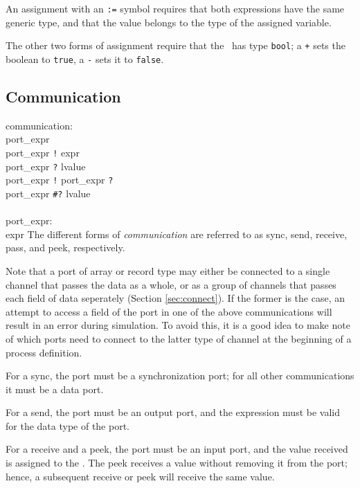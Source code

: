 An assignment with an {\tt{}:=} symbol requires that both expressions
have the same generic type, and that the value belongs to the type of
the assigned variable.

The other two forms of assignment require that the \lvalue\ has type
{\tt{}bool}; a {\tt{}+} sets the boolean to {\tt{}true}, a {\tt{}-} sets it
to {\tt{}false}.



\subsection{Communication}\label{sec:communication}

\grammarstart
communication: \\
       \>port\_expr \\
\orbox \>port\_expr {\tt{}!} expr \\
\orbox \>port\_expr {\tt{}?} lvalue \\
\orbox \>port\_expr {\tt{}!} port\_expr {\tt{}?} \\
\orbox \>port\_expr {\tt{}\#?} lvalue \\
 \\
port\_expr: \\
      \>expr
\grammarend
The different forms of {\it{}communication} are referred to as sync, send,
receive, pass, and peek, respectively.

Note that a port of array or record type may either be connected to a single
channel that passes the data as a whole, or as a group of channels that passes
each field of data seperately (Section \ref{sec:connect}).  If the former is the
case, an attempt to access
a field of the port in one of the above communications will result in an error
during simulation.  To avoid this, it is a good idea to make note of which ports
need to connect to the latter type of channel at the beginning of a process definition.

For a sync,
the port must be a synchronization port; for all other communications it
must be a data port.

For a send, the port must be an output port, and the expression must be
valid for the data type of the port.

For a receive and a peek, the port must be an input port, and the
value received is assigned to the \lvalue. The peek receives a value without
removing it from the port; hence, a subsequent receive or peek will receive
the same value.

